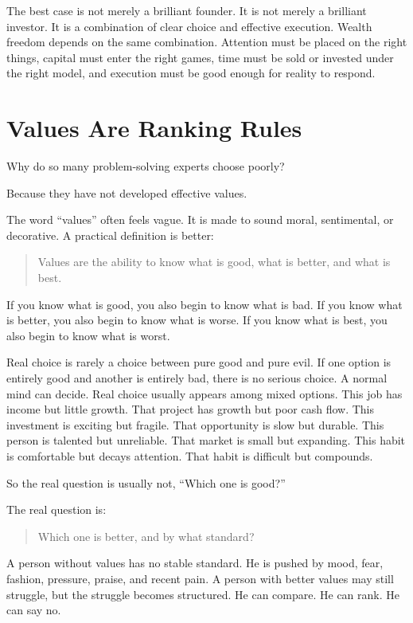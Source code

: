 The best case is not merely a brilliant founder. It is not merely a brilliant investor. It is a combination of clear choice and effective execution. Wealth freedom depends on the same combination. Attention must be placed on the right things, capital must enter the right games, time must be sold or invested under the right model, and execution must be good enough for reality to respond.

\section*{Values Are Ranking Rules}

Why do so many problem-solving experts choose poorly?

Because they have not developed effective values.

The word ``values'' often feels vague. It is made to sound moral, sentimental, or decorative. A practical definition is better:

\begin{quote}
Values are the ability to know what is good, what is better, and what is best.
\end{quote}

If you know what is good, you also begin to know what is bad. If you know what is better, you also begin to know what is worse. If you know what is best, you also begin to know what is worst.

Real choice is rarely a choice between pure good and pure evil. If one option is entirely good and another is entirely bad, there is no serious choice. A normal mind can decide. Real choice usually appears among mixed options. This job has income but little growth. That project has growth but poor cash flow. This investment is exciting but fragile. That opportunity is slow but durable. This person is talented but unreliable. That market is small but expanding. This habit is comfortable but decays attention. That habit is difficult but compounds.

So the real question is usually not, ``Which one is good?''

The real question is:

\begin{quote}
Which one is better, and by what standard?
\end{quote}

A person without values has no stable standard. He is pushed by mood, fear, fashion, pressure, praise, and recent pain. A person with better values may still struggle, but the struggle becomes structured. He can compare. He can rank. He can say no.

